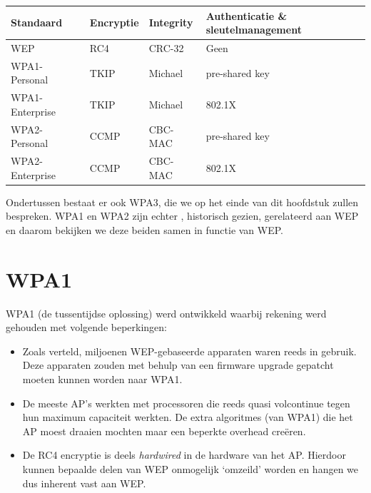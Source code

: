 \documentclass[
  10pt,
  dutch,
  paper=a4,
  ,captions=tableheading
]{scrbook}
\providecommand{\tightlist}{%
  \setlength{\itemsep}{0pt}\setlength{\parskip}{0pt}}
\begin{document}
{\def\LTcaptype{none} %
\begin{longtable}[]{@{}
  >{\raggedright\arraybackslash}p{}
  >{\raggedright\arraybackslash}p{}
  >{\raggedright\arraybackslash}p{}
  >{\raggedright\arraybackslash}p{}@{}}
\toprule\noalign{}
\begin{minipage}[b]{\linewidth}\raggedright
Standaard
\end{minipage} & \begin{minipage}[b]{\linewidth}\raggedright
Encryptie
\end{minipage} & \begin{minipage}[b]{\linewidth}\raggedright
Integrity
\end{minipage} & \begin{minipage}[b]{\linewidth}\raggedright
Authenticatie \& sleutelmanagement
\end{minipage} \\
\midrule\noalign{}
\endhead
\bottomrule\noalign{}
\endlastfoot
WEP & RC4 & CRC-32 & Geen \\
WPA1-Personal & TKIP & Michael & pre-shared key \\
WPA1-Enterprise & TKIP & Michael & 802.1X \\
WPA2-Personal & CCMP & CBC-MAC & pre-shared key \\
WPA2-Enterprise & CCMP & CBC-MAC & 802.1X \\
\end{longtable}
}

\begin{noteblock}
Ondertussen bestaat er ook WPA3, die we op het einde van dit hoofdstuk
zullen bespreken. WPA1 en WPA2 zijn echter , historisch gezien,
gerelateerd aan WEP en daarom bekijken we deze beiden samen in functie
van WEP.
\end{noteblock}

\section{WPA1}\label{wpa1}

WPA1 (de tussentijdse oplossing) werd ontwikkeld waarbij rekening werd
gehouden met volgende beperkingen:

\begin{itemize}
\tightlist
\item
  Zoals verteld, miljoenen WEP-gebaseerde apparaten waren reeds in
  gebruik. Deze apparaten zouden met behulp van een firmware upgrade
  gepatcht moeten kunnen worden naar WPA1.
\item
  De meeste AP's werkten met processoren die reeds quasi volcontinue
  tegen hun maximum capaciteit werkten. De extra algoritmes (van WPA1)
  die het AP moest draaien mochten maar een beperkte overhead creëren.
\item
  De RC4 encryptie is deels \emph{hardwired} in de hardware van het AP.
  Hierdoor kunnen bepaalde delen van WEP onmogelijk `omzeild' worden en
  hangen we dus inherent vast aan WEP.
\end{itemize}
\end{document}
